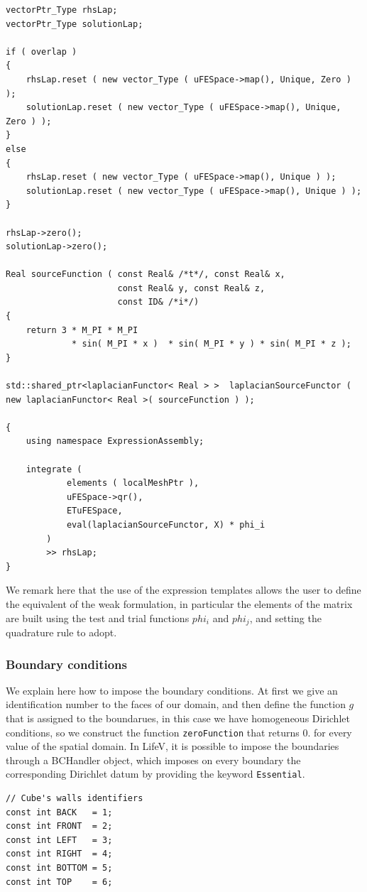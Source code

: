 \begin{itemize}
\begin{lstlisting}
vectorPtr_Type rhsLap;
vectorPtr_Type solutionLap;

if ( overlap )
{
    rhsLap.reset ( new vector_Type ( uFESpace->map(), Unique, Zero ) );
    solutionLap.reset ( new vector_Type ( uFESpace->map(), Unique, Zero ) );
}
else
{
    rhsLap.reset ( new vector_Type ( uFESpace->map(), Unique ) );
    solutionLap.reset ( new vector_Type ( uFESpace->map(), Unique ) );
}

rhsLap->zero();
solutionLap->zero();

Real sourceFunction ( const Real& /*t*/, const Real& x, 
                      const Real& y, const Real& z, 
                      const ID& /*i*/)
{
    return 3 * M_PI * M_PI 
             * sin( M_PI * x )  * sin( M_PI * y ) * sin( M_PI * z );
}

std::shared_ptr<laplacianFunctor< Real > >  laplacianSourceFunctor ( new laplacianFunctor< Real >( sourceFunction ) );

{
    using namespace ExpressionAssembly;
    
    integrate (
            elements ( localMeshPtr ),
            uFESpace->qr(),
            ETuFESpace,
            eval(laplacianSourceFunctor, X) * phi_i
        )
        >> rhsLap;
}
\end{lstlisting}
We remark here that the use of the expression templates allows the user to define the equivalent of the weak formulation, in particular the elements of the matrix are built using the test and trial functions $ phi_i $ and $ phi_j $, and setting the quadrature rule to adopt.

\subsubsection*{Boundary conditions}
We explain here how to impose the boundary conditions. At first we give an identification number to the faces of our domain, and then define the function $ g $ that is assigned to the boundarues, in this case we have homogeneous Dirichlet conditions, so we construct the function \verb!zeroFunction! that returns 0. for every value of the spatial domain. In LifeV, it is possible to impose the boundaries through a BCHandler object, which imposes on every boundary the corresponding Dirichlet datum by providing the keyword \verb!Essential!.
\begin{lstlisting}
// Cube's walls identifiers
const int BACK   = 1;
const int FRONT  = 2;
const int LEFT   = 3;
const int RIGHT  = 4;
const int BOTTOM = 5;
const int TOP    = 6;


\end{lstlisting}
\end{itemize}

